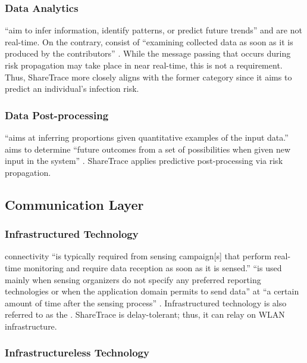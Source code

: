 \subsubsection{Data Analytics}

 ``aim to infer information, identify patterns, or predict future trends'' and are not real-time. On the contrary,  consist of ``examining collected data as soon as it is produced by the contributors'' \citep{Capponi2019}. While the message passing that occurs during risk propagation may take place in near real-time, this is not a requirement. Thus, ShareTrace more closely aligns with the former category since it aims to predict an individual's infection risk.

\subsubsection{Data Post-processing}

 ``aims at inferring proportions given quantitative examples of the input data.''  aims to determine ``future outcomes from a set of possibilities when given new input in the system'' \citep{Capponi2019}. ShareTrace applies predictive post-processing via risk propagation.

\subsection{Communication Layer}

\subsubsection{Infrastructured Technology}

 connectivity ``is typically required from sensing campaign[s] that perform real-time monitoring and require data reception as soon as it is sensed.''  ``is used mainly when sensing organizers do not specify any preferred reporting technologies or when the application domain permits to send data'' at ``a certain amount of time after the sensing process'' \citep{Capponi2019}. Infrastructured technology is also referred to as the  \citep{Ma2014}. ShareTrace is delay-tolerant; thus, it can relay on WLAN infrastructure.

\subsubsection{Infrastructureless Technology}

